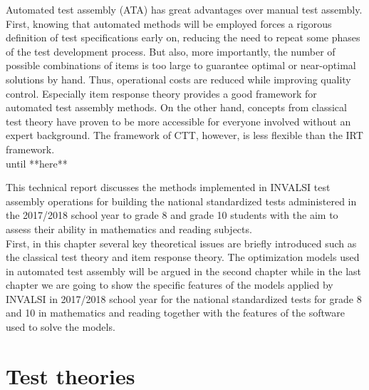\par Automated test assembly (ATA) has great advantages over manual test assembly. First, knowing that automated methods will be employed forces a rigorous definition of test specifications early on, reducing the need to repeat some phases of the test development process. But also, more importantly, the number of possible combinations of items is too large to guarantee optimal or near-optimal solutions by hand. Thus, operational costs are reduced while improving quality control. Especially item response theory provides a good framework for automated test assembly methods. On the other hand, concepts from classical test theory have proven to be more accessible for everyone involved without an expert background. The framework of CTT, however, is less flexible than the IRT framework. \\
until **here** 
\par This technical report discusses the methods implemented in INVALSI test assembly operations for building the national standardized tests administered in the 2017/2018 school year to grade 8 and grade 10 students with the aim to assess their ability in mathematics and reading subjects.\\
First, in this chapter several key theoretical issues are briefly introduced such as the classical test theory and item response theory.
The optimization models used in automated test assembly will be argued in the second chapter while in the last chapter we are going to show the specific features of the models applied by INVALSI in 2017/2018 school year for the national standardized tests for grade 8 and 10 in mathematics and reading together with the features of the software used to solve the models. 
\section{Test theories}\label{sec:test-theories}

